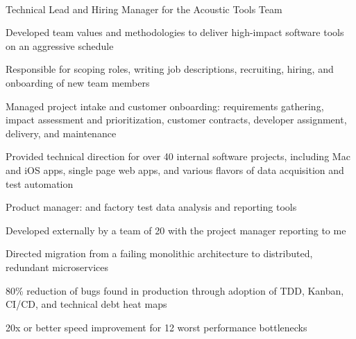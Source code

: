 \documentclass[]{jhearn-resume}
\begin{document}
\begin{minipage}[t]{0.67\textwidth}
 \\
\vspace{\topsep} %
\begin{tightemize}
\item Technical Lead and Hiring Manager for the Acoustic Tools Team
\item Developed team values and methodologies to deliver high-impact software tools on an aggressive schedule
\item Responsible for scoping roles, writing job descriptions, recruiting, hiring, and onboarding of new team members
\item Managed project intake and customer onboarding: requirements gathering, impact assessment and prioritization, customer contracts, developer assignment, delivery, and maintenance   
\item Provided technical direction for over 40 internal software projects, including Mac and iOS apps, single page web apps, and various flavors of data acquisition and test automation
\item Product manager: {} and {} factory test data analysis and reporting tools 
	\begin{tightemize}
	\vspace{\topsep}
	\item Developed externally by a team of 20 with the project manager reporting to me
	\item Directed migration from a failing monolithic architecture to distributed, redundant microservices
	\item 80\% reduction of bugs found in production through adoption of TDD, Kanban, CI/CD, and technical debt heat maps
	\item 20x or better speed improvement for 12 worst performance bottlenecks
	\end{tightemize}
\end{tightemize}
\sectionsep


\end{minipage}
\end{document}
